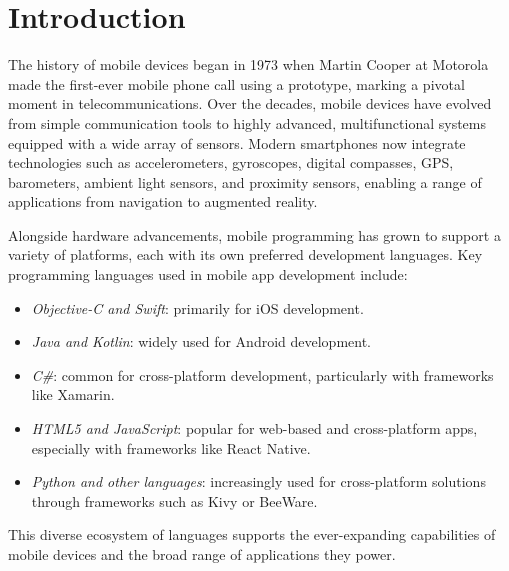 \section{Introduction}

The history of mobile devices began in 1973 when Martin Cooper at Motorola made the first-ever mobile phone call using a prototype, marking a pivotal moment in telecommunications. 
Over the decades, mobile devices have evolved from simple communication tools to highly advanced, multifunctional systems equipped with a wide array of sensors. 
Modern smartphones now integrate technologies such as accelerometers, gyroscopes, digital compasses, GPS, barometers, ambient light sensors, and proximity sensors, enabling a range of applications from navigation to augmented reality.

Alongside hardware advancements, mobile programming has grown to support a variety of platforms, each with its own preferred development languages. 
Key programming languages used in mobile app development include: 
\begin{itemize} 
    \item \textit{Objective-C and Swift}: primarily for iOS development. 
    \item \textit{Java and Kotlin}: widely used for Android development. 
    \item \textit{C\#}: common for cross-platform development, particularly with frameworks like Xamarin.
    \item \textit{HTML5 and JavaScript}: popular for web-based and cross-platform apps, especially with frameworks like React Native.
    \item \textit{Python and other languages}: increasingly used for cross-platform solutions through frameworks such as Kivy or BeeWare.
\end{itemize}
This diverse ecosystem of languages supports the ever-expanding capabilities of mobile devices and the broad range of applications they power.